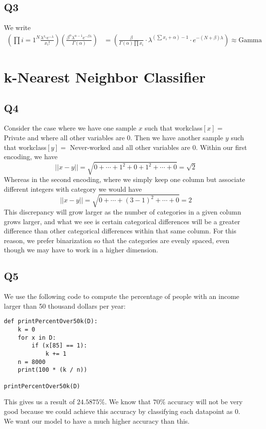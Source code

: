 \documentclass{article}
\theoremstyle{definition}
\begin{document}
    \subsection{Q3}
    We write 
    \begin{align*}
        \left(\prod{i=1}^N \frac{\lambda^{x_i}e^{-\lambda}}{x_i!}\right)\left(\frac{\beta^\alpha\lambda^{\alpha-1}e^{-\beta\lambda}}{\Gamma(\alpha)} \right)
        &= \left(
            \frac{\beta}
            {\Gamma(\alpha)\prod x_i}\cdot \lambda^{(\sum x_i + \alpha) - 1}\cdot e^{-(N + \beta)\lambda} 
        \right) \approx \text{Gamma}
    \end{align*}
\section{k-Nearest Neighbor Classifier}
    \subsection{Q4}
        Consider the case where we have one sample $x$ such that workclass$[x] = $ Private 
        and where all other variables are 0. Then we have another sample $y$ such that 
        workclass$[y] = $ Never-worked and all other variables are 0. Within our first encoding, we have 
        \[
            ||x - y|| = \sqrt{ 0 + \cdots + 1^2 + 0 + 1^2 + \cdots + 0} = \sqrt{2}
        \]
        Whereas in the second encoding, where we simply keep one column but associate different integers with category we would have 
        \[
            ||x - y|| = \sqrt{0 + \cdots + (3 - 1)^2 + \cdots + 0} = 2
        \]
        This discrepancy will grow larger as the number of categories in a given column grows larger, and 
        what we see is certain categorical differences will be a greater difference than other categorical differences
        within that same column. For this reason, we prefer binarization so that the categories are evenly spaced,
        even though we may have to work in a higher dimension.
    \subsection{Q5}
    We use the following code to compute the percentage of people with an income larger than 50 thousand dollars per year:
        \begin{verbatim}
def printPercentOver50k(D):
    k = 0
    for x in D:
        if (x[85] == 1):
            k += 1
    n = 8000
    print(100 * (k / n))

printPercentOver50k(D)
            \end{verbatim}
            This gives us a result of $24.5875 \%$. We know that $70\%$ accuracy will not be very good because we could achieve 
            this accuracy by classifying each datapoint as 0. We want our model to have a much higher accuracy than this.
\end{document}
